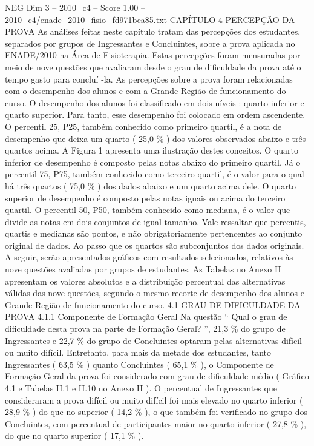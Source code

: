 \begin{textsample}{NEG Dim 3 – 2010\_c4 – Score 1.00 – 2010\_c4/enade\_2010\_fisio\_fd971bea85.txt}  \label{ex:f3_neg_120}
CAPÍTULO 4 PERCEPÇÃO DA PROVA As análises feitas neste capítulo tratam das percepções dos estudantes, separados por grupos de Ingressantes e Concluintes, sobre a prova aplicada no ENADE/2010 na Área de Fisioterapia.
Estas percepções foram mensuradas por meio de nove questões que avaliaram desde o grau de dificuldade da prova até o tempo gasto para concluí -la.
As percepções sobre a prova foram relacionadas com o desempenho dos alunos e com a Grande Região de funcionamento do curso.
O desempenho dos alunos foi classificado em dois níveis : quarto inferior e quarto superior.
Para tanto, esse desempenho foi colocado em ordem ascendente.
O percentil 25, P25, também conhecido como primeiro quartil, é a nota de desempenho que deixa um quarto ( 25,0 \% ) dos valores observados abaixo e três quartos acima.
A Figura 1 apresenta uma ilustração destes conceitos.
O quarto inferior de desempenho é composto pelas notas abaixo do primeiro quartil.
Já o percentil 75, P75, também conhecido como terceiro quartil, é o valor para o qual há três quartos ( 75,0 \% ) dos dados abaixo e um quarto acima dele.
O quarto superior de desempenho é composto pelas notas iguais ou acima do terceiro quartil.
O percentil 50, P50, também conhecido como mediana, é o valor que divide as notas em dois conjuntos de igual tamanho.
Vale ressaltar que percentis, quartis e medianas são pontos, e não obrigatoriamente pertencentes ao conjunto original de dados.
Ao passo que os quartos são subconjuntos dos dados originais.
A seguir, serão apresentados gráficos com resultados selecionados, relativos às nove questões avaliadas por grupos de estudantes.
As Tabelas no Anexo II apresentam os valores absolutos e a distribuição percentual das alternativas válidas das nove questões, segundo o mesmo recorte de desempenho dos alunos e Grande Região de funcionamento do curso. 4.1 GRAU DE DIFICULDADE DA PROVA 4.1.1 Componente de Formação Geral Na questão “ Qual o grau de dificuldade desta prova na parte de Formação Geral? ”, 21,3 \% do grupo de Ingressantes e 22,7 \% do grupo de Concluintes optaram pelas alternativas difícil ou muito difícil.
Entretanto, para mais da metade dos estudantes, tanto Ingressantes ( 63,5 \% ) quanto Concluintes ( 65,1 \% ), o Componente de Formação Geral da prova foi considerado com grau de dificuldade médio ( Gráfico 4.1 e Tabelas II.1 e II.10 no Anexo II ).
O percentual de Ingressantes que consideraram a prova difícil ou muito difícil foi mais elevado no quarto inferior ( 28,9 \% ) do que no superior ( 14,2 \% ), o que também foi verificado no grupo dos Concluintes, com percentual de participantes maior no quarto inferior ( 27,8 \% ), do que no quarto superior ( 17,1 \% ).

\end{textsample}
